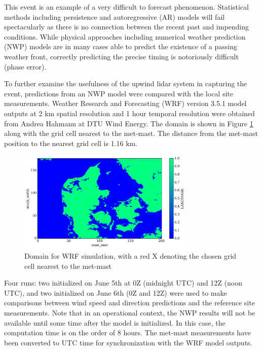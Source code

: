 This event is an example of a very difficult to forecast phenomenon. Statistical methods including persistence and autoregressive (AR) models will fail spectacularly as there is no connection between the recent past and impending conditions. While physical approaches including numerical weather prediction (NWP) models are in many cases able to predict the existence of a passing weather front, correctly predicting the precise timing is notoriously difficult (phase error).

To further examine the usefulness of the upwind lidar system in capturing the event, predictions from an NWP model were compared with the local site measurements. 
Weather Research and Forecasting (WRF) version 3.5.1 model outputs at 2 km spatial resolution and 1 hour temporal resolution were obtained from Andrea Hahmann at DTU Wind Energy. The domain is shown in Figure \ref{fig:wrf_grid_annotated} along with the grid cell nearest to the met-mast. The distance from the met-mast position to the nearest grid cell is 1.16 km.

\begin{figure}[htbp]
    \centering
        \includegraphics[width=0.75\textwidth]{graphics/results/balcony-addendum/wrf_grid_annotated.png}
    \caption{Domain for WRF simulation, with a red X denoting the chosen grid cell nearest to the met-mast}
    \label{fig:wrf_grid_annotated}
\end{figure}

Four runs: two initialized on June 5th at 0Z (midnight UTC) and 12Z (noon UTC), and two initialized on June 6th (0Z and 12Z) were used to make comparisons between wind speed and direction predictions and the reference site measurements. Note that in an operational context, the NWP results will not be available until some time after the model is initialized. In this case, the computation time is on the order of 8 hours. The met-mast measurements have been converted to UTC time for synchronization with the WRF model outputs.

